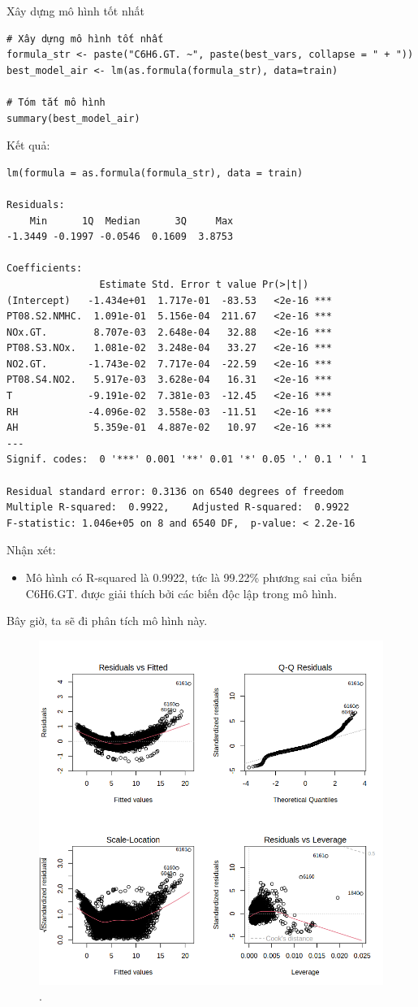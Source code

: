 Xây dựng mô hình tốt nhất
\begin{lstlisting}
# Xây dựng mô hình tốt nhất
formula_str <- paste("C6H6.GT. ~", paste(best_vars, collapse = " + "))
best_model_air <- lm(as.formula(formula_str), data=train)

# Tóm tắt mô hình
summary(best_model_air)
\end{lstlisting}
Kết quả:
\begin{lstlisting}
lm(formula = as.formula(formula_str), data = train)

Residuals:
    Min      1Q  Median      3Q     Max 
-1.3449 -0.1997 -0.0546  0.1609  3.8753 

Coefficients:
                Estimate Std. Error t value Pr(>|t|)    
(Intercept)   -1.434e+01  1.717e-01  -83.53   <2e-16 ***
PT08.S2.NMHC.  1.091e-01  5.156e-04  211.67   <2e-16 ***
NOx.GT.        8.707e-03  2.648e-04   32.88   <2e-16 ***
PT08.S3.NOx.   1.081e-02  3.248e-04   33.27   <2e-16 ***
NO2.GT.       -1.743e-02  7.717e-04  -22.59   <2e-16 ***
PT08.S4.NO2.   5.917e-03  3.628e-04   16.31   <2e-16 ***
T             -9.191e-02  7.381e-03  -12.45   <2e-16 ***
RH            -4.096e-02  3.558e-03  -11.51   <2e-16 ***
AH             5.359e-01  4.887e-02   10.97   <2e-16 ***
---
Signif. codes:  0 '***' 0.001 '**' 0.01 '*' 0.05 '.' 0.1 ' ' 1

Residual standard error: 0.3136 on 6540 degrees of freedom
Multiple R-squared:  0.9922,	Adjusted R-squared:  0.9922 
F-statistic: 1.046e+05 on 8 and 6540 DF,  p-value: < 2.2e-16
\end{lstlisting}
Nhận xét:
\begin{itemize}
    \item Mô hình có R-squared là 0.9922, tức là 99.22\% phương sai của biến C6H6.GT. được giải thích bởi các biến độc lập trong mô hình.
\end{itemize}

Bây giờ, ta sẽ đi phân tích mô hình này. 
\begin{figure}[H]
    \centering
    \includegraphics[width=0.75\columnwidth]{air_figures/best_model_air.png}
    \caption{.}
    \label{fig:best_model_air}
\end{figure}


